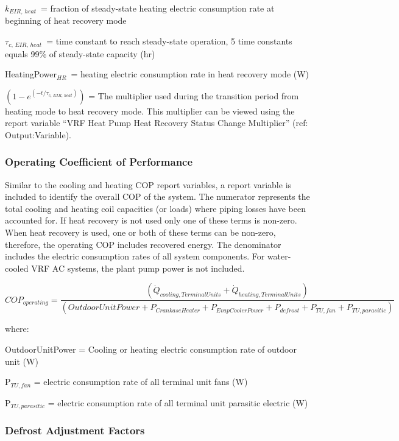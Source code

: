 \(k_{EIR,\,heat}\) = fraction of steady-state heating electric consumption rate at beginning of heat recovery mode

\(\tau_{c,\,EIR,\,heat}\) = time constant to reach steady-state operation, 5 time constants equals 99\% of steady-state capacity (hr)

HeatingPower\(_{HR}\) = heating electric consumption rate in heat recovery mode (W)

\(\left( 1 - e^{\left( -t / \tau_{c,\,EIR,\,heat} \right)} \right)\) = The multiplier used during the transition period from heating mode to heat recovery mode. This multiplier can be viewed using the report variable ``VRF Heat Pump Heat Recovery Status Change Multiplier'' (ref: Output:Variable).

\subsubsection{Operating Coefficient of Performance}\label{operating-coefficient-of-performance}

Similar to the cooling and heating COP report variables, a report variable is included to identify the overall COP of the system. The numerator represents the total cooling and heating coil capacities (or loads) where piping losses have been accounted for. If heat recovery is not used only one of these terms is non-zero. When heat recovery is used, one or both of these terms can be non-zero, therefore, the operating COP includes recovered energy. The denominator includes the electric consumption rates of all system components. For water-cooled VRF AC systems, the plant pump power is not included.

\begin{equation}
  COP_{operating} = \frac{\left( \dot{Q}_{cooling,TerminalUnits} + \dot{Q}_{heating,TerminalUnits} \right)}{\left( OutdoorUnitPower + P_{CrankaseHeater} + P_{EvapCoolerPower} + P_{defrost} + P_{TU,fan} + P_{TU,parasitic} \right)}
\end{equation}

where:

OutdoorUnitPower = Cooling or heating electric consumption rate of outdoor unit (W)

P\(_{TU,fan}\) = electric consumption rate of all terminal unit fans (W)

P\(_{TU,parasitic}\) = electric consumption rate of all terminal unit parasitic electric (W)

\subsubsection{Defrost Adjustment Factors}\label{defrost-adjustment-factors}

